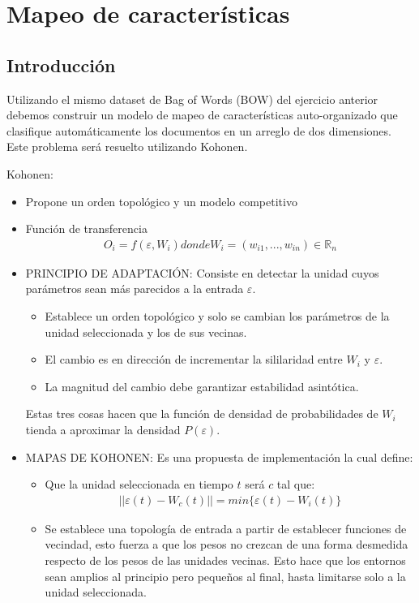 \section{Mapeo de características}

\subsection{Introducción}

Utilizando el mismo dataset de Bag of Words (BOW) del ejercicio anterior debemos construir un modelo de mapeo de características auto-organizado que clasifique automáticamente los 
documentos en un arreglo de dos dimensiones. Este problema será resuelto utilizando Kohonen.

Kohonen:
\begin{itemize}
	\item Propone un orden topológico y un modelo competitivo
	\item Función de transferencia 
				\begin{align*}
					O_{i}=f(\varepsilon, W_{i}) donde W_{i}=(w_{i1}, ..., w_{in}) \in \mathbb{R}_{n}
				\end{align*}
	
	\item PRINCIPIO DE ADAPTACIÓN: Consiste en detectar la unidad cuyos parámetros sean más parecidos a la entrada $\varepsilon$.
		\begin{itemize}
			\item Establece un orden topológico y solo se cambian los parámetros de la unidad seleccionada y los de sus vecinas.
			\item El cambio es en dirección de incrementar la sililaridad entre $W_{i}$ y $\varepsilon$.
			\item La magnitud del cambio debe garantizar estabilidad asintótica.
		\end{itemize}
		Estas tres cosas hacen que la función de densidad de probabilidades de $W_{i}$ tienda a aproximar la densidad $P(\varepsilon)$.
	\item MAPAS DE KOHONEN: Es una propuesta de implementación la cual define:
		\begin{itemize}
			\item Que la unidad seleccionada en tiempo $t$ será $c$ tal que:
				\begin{align*}
					||\varepsilon(t) - W_{c}(t)|| = min\{\varepsilon(t) - W_{i}(t)\}
				\end{align*}
			
			\item Se establece una topología de entrada a partir de establecer funciones de vecindad, esto fuerza a que los pesos no crezcan de una forma desmedida respecto de los 
			pesos de las unidades vecinas. Esto hace que los entornos sean amplios al principio pero pequeños al final, hasta limitarse solo a la unidad seleccionada.
				

\end{itemize}
\end{itemize}
